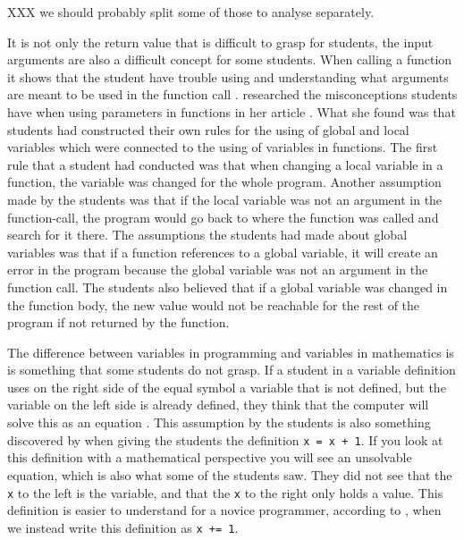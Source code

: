 XXX we should probably split some of those to analyse separately.

It is not only the return value that is difficult to grasp for students, the 
input arguments are also a difficult concept for some students. When calling a 
function it shows that the student have trouble using and understanding what 
arguments are meant to be used in the function call 
\parencite{AltadmriBrown2015}. \Textcite{Fleury1991} researched the 
misconceptions students have when using parameters in functions in her article 
.
What she found was that students had constructed their own rules for the using 
of global and local variables which were connected to the using of variables in 
functions. The first rule that a student had conducted was that when changing a 
local variable in a function, the variable was changed for the whole program. 
Another assumption made by the students was that if the local variable was not 
an argument in the function-call, the program would go back to where the 
function was called and search for it there. The assumptions the students had 
made about global variables was that if a function references to a global 
variable, it will create an error in the program because the global variable 
was not an argument in the function call. The students also believed that if a 
global variable was changed in the function body, the new value would not be 
reachable for the rest of the program if not returned by the function.

The difference between variables in programming and variables in mathematics is 
is something that some students do not grasp. If a student in a variable 
definition uses on the right side of the equal symbol a variable that is not 
defined, but the variable on the left side is already defined, they think that 
the computer will solve this as an equation \parencite{Plass2015Variables}. 
This assumption by the students is also something discovered by 
\textcite{Kohn2017VariableEvaluation} when giving the students the definition 
\verb'x = x + 1'. If you look at this definition with a mathematical 
perspective you will see an unsolvable equation, which is also what some of the 
students saw. They did not see that the \verb'x' to the left is the variable, 
and that the \verb'x' to the right only holds a value. This definition is  
easier to understand for a novice programmer, according to 
\textcite{Kohn2017VariableEvaluation}, when we instead write this definition as 
\verb'x += 1'. 

